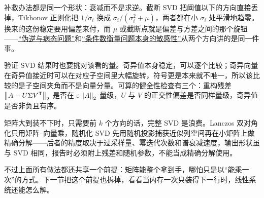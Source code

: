 补救办法都是同一个形状：衰减而不是求逆。截断 SVD 把阈值以下的方向直接丢掉，Tikhonov 正则化把 \(1/\sigma_i\) 换成 \(\sigma_i/(\sigma_i^2+\mu)\)，两者都在小 \(\sigma_i\) 处平滑地趋零。换来的这份稳定要用偏差来付，而 \(\mu\) 或截断点就是偏差与方差之间的那个旋钮——\hyperref[sec:03-Linear-Algebra/07-SVD-and-Data-Applications/02]{``伪逆与病态问题''}和\hyperref[sec:08-Numerical-Analysis/01-Floating-Point-and-Error/03]{``条件数衡量问题本身的敏感性''}从两个方向讲的是同一件事。

验证 SVD 结果时也要挑对该看的量。奇异值本身稳定，可以逐个比较；奇异向量在奇异值接近时可以在对应子空间里大幅旋转，符号更是本来就不唯一，所以该比较的是子空间夹角而不是向量分量。可算的健全性检查有三个：重构残差 \(\left\lVert A-U\Sigma V^{\mathsf{T}}\right\rVert_2\) 是否在 \(\varepsilon\left\lVert A\right\rVert_2\) 量级，\(U\) 与 \(V\) 的正交性偏差是否同样量级，奇异值是否非负且有序。

矩阵大到装不下时，只需要前 \(k\) 个方向的话，完整 SVD 是浪费。Lanczos 双对角化只用矩阵--向量乘，随机化 SVD 先用随机投影捕获近似列空间再在小矩阵上做精确分解——后者的精度取决于过采样量、幂迭代次数和谱衰减速度，输出形状虽与 SVD 相同，报告时必须附上残差和随机参数，不能当成精确分解使用。

不过上面所有做法都还共享一个前提：矩阵能整个拿到手，哪怕只是以``能乘一次''的方式。下一节把这个前提也拆掉，看看当内存一次只装得下一行时，线性系统还能怎么解。

